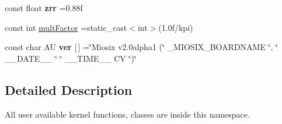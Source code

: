 \begin{DoxyCompactItemize}
\item 
\hypertarget{namespacemiosix_a3671115cc0816847d7d7305bc5864c6d}{const float {\bfseries zrr} =0.\-88f}\label{namespacemiosix_a3671115cc0816847d7d7305bc5864c6d}

\item 
const int \hyperlink{namespacemiosix_ac4774f319395e90899e2aa549444495b}{mult\-Factor} =static\-\_\-cast$<$int$>$(1.\-0f/kpi)
\item 
\hypertarget{namespacemiosix_a71f3e2f3555359f1d3faf75d1c4af68f}{const char A\-U {\bfseries ver} \mbox{[}$\,$\mbox{]} =\char`\"{}Miosix v2.\-0alpha1 (\char`\"{} \-\_\-\-M\-I\-O\-S\-I\-X\-\_\-\-B\-O\-A\-R\-D\-N\-A\-M\-E \char`\"{}, \char`\"{} \-\_\-\-\_\-\-D\-A\-T\-E\-\_\-\-\_\- \char`\"{} \char`\"{} \-\_\-\-\_\-\-T\-I\-M\-E\-\_\-\-\_\- C\-V \char`\"{})\char`\"{}}\label{namespacemiosix_a71f3e2f3555359f1d3faf75d1c4af68f}

\end{DoxyCompactItemize}


\subsection{Detailed Description}
All user available kernel functions, classes are inside this namespace. 

